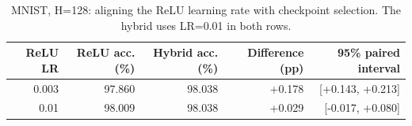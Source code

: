 \begin{table}[htbp]
\centering
\caption{MNIST, H=128: aligning the ReLU learning rate with checkpoint selection. The hybrid uses LR=0.01 in both rows.}
\label{tab:aligned}
\small
\begin{tabular}{@{}rrrrr@{}}
\toprule
ReLU LR & ReLU acc. (\%) & Hybrid acc. (\%) & Difference (pp) & 95\% paired interval \\
\midrule
0.003 & 97.860 & 98.038 & +0.178 & [+0.143, +0.213] \\
0.01 & 98.009 & 98.038 & +0.029 & [-0.017, +0.080] \\
\bottomrule
\end{tabular}
\end{table}
